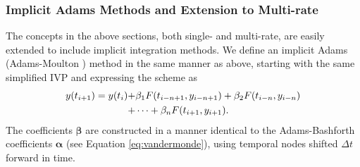 \subsubsection{Implicit Adams Methods and Extension to Multi-rate}

The concepts in the above sections, both single- and multi-rate, are
easily extended to include implicit integration methods. We define an
implicit Adams (Adams-Moulton \cite{moulton1926new}) method in the same manner as above, starting
with the same simplified IVP  and expressing the scheme as
\begin{align}
y(t_{i+1}) = y(t_{i}) +& \beta_{1}F(t_{i-n+1},y_{i-n+1}) + \beta_{2}F(t_{i-n},y_{i-n}) \notag \\
+& \cdots + \beta_{n}F(t_{i+1},y_{i+1}). \label{eq:am_general}
\end{align}
The coefficients $\boldsymbol{\beta}$ are constructed in a manner identical to
the Adams-Bashforth coefficients $\boldsymbol{\alpha}$ (see Equation \ref{eq:vandermonde}),
using temporal nodes shifted $\Delta t$ forward in time.

